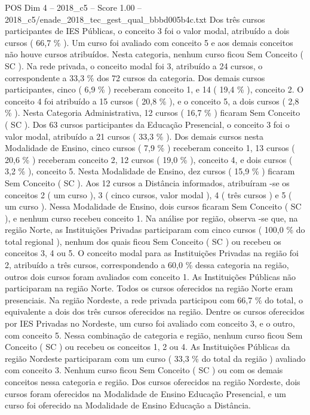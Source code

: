 \begin{textsample}{POS Dim 4 – 2018\_c5 – Score 1.00 – 2018\_c5/enade\_2018\_tec\_gest\_qual\_bbbd005b4c.txt}
Dos três cursos participantes de IES Públicas, o conceito 3 foi o valor modal, atribuído a dois cursos ( 66,7 \% ).
Um curso foi avaliado com conceito 5 e aos demais conceitos não houve cursos atribuídos.
Nesta categoria, nenhum curso ficou Sem Conceito ( SC ).
Na rede privada, o conceito modal foi 3, atribuído a 24 cursos, o correspondente a 33,3 \% dos 72 cursos da categoria.
Dos demais cursos participantes, cinco ( 6,9 \% ) receberam conceito 1, e 14 ( 19,4 \% ), conceito 2.
O conceito 4 foi atribuído a 15 cursos ( 20,8 \% ), e o conceito 5, a dois cursos ( 2,8 \% ).
Nesta Categoria Administrativa, 12 cursos ( 16,7 \% ) ficaram Sem Conceito ( SC ).
Dos 63 cursos participantes da Educação Presencial, o conceito 3 foi o valor modal, atribuído a 21 cursos ( 33,3 \% ).
Dos demais cursos nesta Modalidade de Ensino, cinco cursos ( 7,9 \% ) receberam conceito 1, 13 cursos ( 20,6 \% ) receberam conceito 2, 12 cursos ( 19,0 \% ), conceito 4, e dois cursos ( 3,2 \% ), conceito 5.
Nesta Modalidade de Ensino, dez cursos ( 15,9 \% ) ficaram Sem Conceito ( SC ).
Aos 12 cursos a Distância informados, atribuíram -se os conceitos 2 ( um curso ), 3 ( cinco cursos, valor modal ), 4 ( três cursos ) e 5 ( um curso ).
Nessa Modalidade de Ensino, dois cursos ficaram Sem Conceito ( SC ), e nenhum curso recebeu conceito 1.
Na análise por região, observa -se que, na região Norte, as Instituições Privadas participaram com cinco cursos ( 100,0 \% do total regional ), nenhum dos quais ficou Sem Conceito ( SC ) ou recebeu os conceitos 3, 4 ou 5.
O conceito modal para as Instituições Privadas na região foi 2, atribuído a três cursos, correspondendo a 60,0 \% dessa categoria na região, outros dois cursos foram avaliados com conceito 1.
As Instituições Públicas não participaram na região Norte.
Todos os cursos oferecidos na região Norte eram presenciais.
Na região Nordeste, a rede privada participou com 66,7 \% do total, o equivalente a dois dos três cursos oferecidos na região.
Dentre os cursos oferecidos por IES Privadas no Nordeste, um curso foi avaliado com conceito 3, e o outro, com conceito 5.
Nessa combinação de categoria e região, nenhum curso ficou Sem Conceito ( SC ) ou recebeu os conceitos 1, 2 ou 4.
As Instituições Públicas da região Nordeste participaram com um curso ( 33,3 \% do total da região ) avaliado com conceito 3.
Nenhum curso ficou Sem Conceito ( SC ) ou com os demais conceitos nessa categoria e região.
Dos cursos oferecidos na região Nordeste, dois cursos foram oferecidos na Modalidade de Ensino Educação Presencial, e um curso foi oferecido na Modalidade de Ensino Educação a Distância.

\end{textsample}

